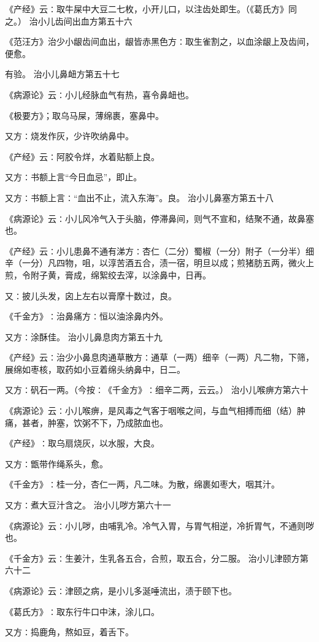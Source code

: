 \documentclass[a4paper,12pt,UTF8,twoside]{ctexbook}
\begin{document}
《产经》云∶取牛屎中大豆二七枚，小开儿口，以注齿处即生。（《葛氏方》同之。）
治小儿齿间出血方第五十六

《范汪方》治少小龈齿间血出，龈皆赤黑色方∶取生雀割之，以血涂龈上及齿间，便愈。

有验。
治小儿鼻衄方第五十七

《病源论》云∶小儿经脉血气有热，喜令鼻衄也。

《极要方》；取乌马屎，薄绵裹，塞鼻中。

又方∶烧发作灰，少许吹纳鼻中。

《产经》云∶阿胶令烊，水着贴额上良。

又方∶书额上言“今日血忌”，即止。

又方∶书额上言∶“血出不止，流入东海”。良。
治小儿鼻塞方第五十八

《病源论》云∶小儿风冷气入于头脑，停滞鼻间，则气不宣和，结聚不通，故鼻塞也。

《产经》云∶小儿患鼻不通有涕方∶杏仁（二分）蜀椒（一分）附子（一分半）细辛（一分）凡四物，咀，以淳苦酒五合，渍一宿，明旦以成；煎猪肪五两，微火上煎，令附子黄，膏成，绵絮绞去滓，以涂鼻中，日再。

又∶披儿头发，囟上左右以膏摩十数过，良。

《千金方》∶治鼻痛方∶恒以油涂鼻内外。

又方∶涂酥佳。
治小儿鼻息肉方第五十九

《产经》云∶治少小鼻息肉通草散方∶通草（一两）细辛（一两）凡二物，下筛，展绵如枣核，取药如小豆着绵头纳鼻中，日二。

又方∶矾石一两。（今按∶《千金方》∶细辛二两，云云。）
治小儿喉痹方第六十

《病源论》云∶小儿喉痹，是风毒之气客于咽喉之间，与血气相搏而细（结）肿痛，甚者，肿塞，饮粥不下，乃成脓血也。

《产经》∶取乌扇烧灰，以水服，大良。

又方∶甑带作绳系头，愈。

《千金方》∶桂一分，杏仁一两，凡二味。为散，绵裹如枣大，咽其汁。

又方∶煮大豆汁含之。
治小儿哕方第六十一

《病源论》云∶小儿哕，由哺乳冷。冷气入胃，与胃气相逆，冷折胃气，不通则哕也。

《千金方》云∶生姜汁，生乳各五合，合煎，取五合，分二服。
治小儿津颐方第六十二

《病源论》云∶津颐之病，是小儿多涎唾流出，渍于颐下也。

《葛氏方》∶取东行牛口中沫，涂儿口。

又方∶捣鹿角，熬如豆，着舌下。
\end{document}
